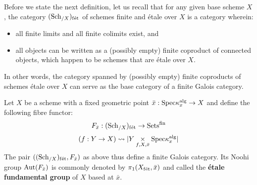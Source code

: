             Before we state the next definition, let us recall that for any given base scheme $X$, the category $(\mathrm{Sch}_{/X})_{\mathrm{f\acute{e}t}}$ of schemes finite and \'etale over $X$ is a category wherein:
                \begin{itemize}
                    \item all finite limits and all finite colimits exist, and
                    \item all objects can be written as a (possibly empty) finite coproduct of connected objects, which happen to be schemes that are \'etale over $X$.  
                \end{itemize}
            In other words, the category spanned by (possibly empty) finite coproducts of schemes \'etale over $X$ can serve as the base category of a finite Galois category. 
            \begin{definition} \label{def: etale_fundamental_groups}
                Let $X$ be a scheme with a fixed geometric point $\bar{x}: \mathrm{Spec} \kappa_x^{\mathrm{alg}} \to X$ and define the following fibre functor:
                    $$F_{\bar{x}}: (\mathrm{Sch}_{/X})_{\mathrm{f\acute{e}t}} \to \mathrm{Sets}^{\mathrm{fin}}$$
                    $$(f: Y \to X) \mapsto |Y \x_{f, X, \bar{x}} \Spec \kappa_x^{\alg}|$$
                The pair $((\mathrm{Sch}_{/X})_{\mathrm{f\acute{e}t}}, F_{\bar{x}})$ as above thus define a finite Galois category. Its Noohi group $\mathrm{Aut}(F_{\bar{x}})$ is commonly denoted by $\pi_1(X_{\mathrm{f\acute{e}t}}, \bar{x})$ and called the \textbf{\'etale fundamental group} of $X$ based at $\bar{x}$.
            \end{definition}
